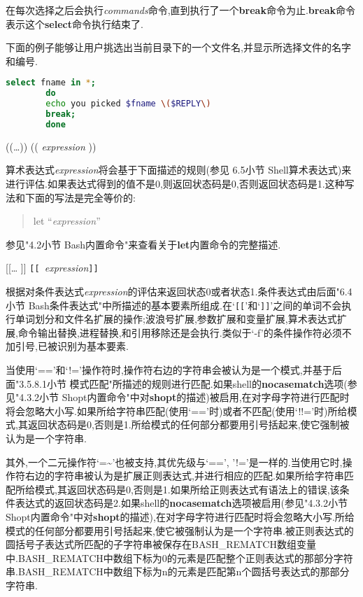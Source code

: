 \documentclass[draft,openany]{book}
\begin{document}
\begin{CJK}{UTF8}{gbsn}
\begin{basedescript}{\desclabelstyle{\nextlinelabel}\desclabelwidth{2.5em}}
        在每次选择之后会执行\emph{commands}命令,直到执行了一个\textbf{break}命令为止.\textbf{break}命令表示这个\textbf{select}命令执行结束了.\par
        下面的例子能够让用户挑选出当前目录下的一个文件名,并显示所选择文件的名字和编号.\par
        \begin{lstlisting}[language=bash]
        select fname in *;
        do
        echo you picked $fname \($REPLY\)
        break;
        done
        \end{lstlisting}
    \item[((\ldots))] (( \emph{expression} ))\par
        算术表达式\emph{expression}将会基于下面描述的规则(参见 6.5小节 Shell算术表达式)来进行评估.如果表达式得到的值不是0,则返回状态码是0,否则返回状态码是1.这种写法和下面的写法是完全等价的:
        \begin{quote}
            let ``\emph{expression}''
        \end{quote}
        参见"4.2小节 Bash内置命令"来查看关于\textbf{let}内置命令的完整描述.
    \item[[[\ldots]]] \verb+[[ +\emph{expression}\verb+]]+\par
        根据对条件表达式\emph{expression}的评估来返回状态0或者状态1.条件表达式由后面"6.4小节 Bash条件表达式"中所描述的基本要素所组成.在`\verb+[[+'和`\verb+]]+'之间的单词不会执行单词划分和文件名扩展的操作;波浪号扩展,参数扩展和变量扩展,算术表达式扩展,命令输出替换,进程替换,和引用移除还是会执行.类似于`-f'的条件操作符必须不加引号,已被识别为基本要素.\par
        当使用`=='和`!='操作符时,操作符右边的字符串会被认为是一个模式,并基于后面"3.5.8.1小节 模式匹配"所描述的规则进行匹配.如果shell的\textbf{nocasematch}选项(参见"4.3.2小节 Shopt内置命令"中对\textbf{shopt}的描述)被启用,在对字母字符进行匹配时将会忽略大小写.如果所给字符串匹配(使用`=='时)或者不匹配(使用`!!='时)所给模式,其返回状态码是0,否则是1.所给模式的任何部分都要用引号括起来,使它强制被认为是一个字符串.\par
        其外,一个二元操作符`=\~{}'也被支持,其优先级与`==', '!='是一样的.当使用它时,操作符右边的字符串被认为是扩展正则表达式,并进行相应的匹配.如果所给字符串匹配所给模式,其返回状态码是0,否则是1.如果所给正则表达式有语法上的错误,该条件表达式的返回状态码是2.如果shell的\textbf{nocasematch}选项被启用(参见"4.3.2小节 Shopt内置命令"中对\textbf{shopt}的描述),在对字母字符进行匹配时将会忽略大小写.所给模式的任何部分都要用引号括起来,使它被强制认为是一个字符串.被正则表达式的圆括号子表达式所匹配的子字符串被保存在BASH\_REMATCH数组变量中.BASH\_REMATCH中数组下标为0的元素是匹配整个正则表达式的那部分字符串.BASH\_REMATCH中数组下标为n的元素是匹配第n个圆括号表达式的那部分字符串.\par

\end{basedescript}
\end{CJK}
\end{document}
